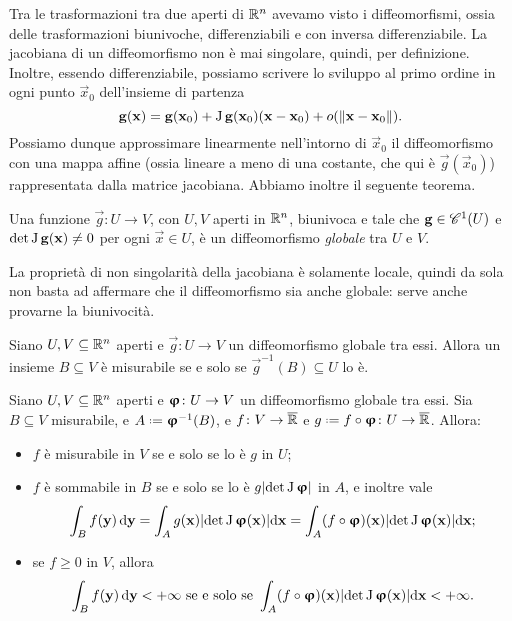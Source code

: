 Tra le trasformazioni tra due aperti di $\R^n$ avevamo visto i diffeomorfismi, ossia delle trasformazioni biunivoche, differenziabili e con inversa differenziabile. La jacobiana di un diffeomorfismo non è mai singolare, quindi, per definizione.
Inoltre, essendo differenziabile, possiamo scrivere lo sviluppo al primo ordine in ogni punto $\vec x_0$ dell'insieme di partenza
\begin{equation}
	\vec g(\vec x)=\vec g(\vec x_0)+\jac\vec g(\vec x_0)(\vec x-\vec x_0)+o(\norm{\vec x-\vec x_0}).
\end{equation}
Possiamo dunque approssimare linearmente nell'intorno di $\vec x_0$ il diffeomorfismo con una mappa affine (ossia lineare a meno di una costante, che qui è $\vec g(\vec x_0)$) rappresentata dalla matrice jacobiana.
Abbiamo inoltre il seguente teorema.
\begin{teorema} \label{t:diffeomorfismo-globale}
	Una funzione $\vec g\colon U\to V$, con $U,V$ aperti in $\R^n$, biunivoca e tale che $\vec g\in\cont[1]{U}$ e $\det\jac\vec g(\vec x)\neq 0$ per ogni $\vec x\in U$, è un diffeomorfismo \emph{globale} tra $U$ e $V$.
\end{teorema}
La proprietà di non singolarità della jacobiana è solamente locale, quindi da sola non basta ad affermare che il diffeomorfismo sia anche globale: serve anche provarne la biunivocità.
\begin{teorema} \label{t:diffeomorfismo-misurabilita-insieme}
	Siano $U,V\subseteq\R^n$ aperti e $\vec g\colon U\to V$ un diffeomorfismo globale tra essi.
	Allora un insieme $B\subseteq V$ è misurabile se e solo se $\vec g^{-1}(B)\subseteq U$ lo è.
\end{teorema}
\begin{teorema} \label{t:composizione-diffeomorfismo-misurabile}
	Siano $U,V\subseteq\R^n$ aperti e $\vphi\colon U\to V$ un diffeomorfismo globale tra essi.
	Sia $B\subseteq V$ misurabile, e $A\defeq\vphi^{-1}(B)$, e $f\colon V\to\Rex$ e $g\defeq f\circ\vphi\colon U\to\Rex$.
	Allora:
	\begin{itemize}
		\item $f$ è misurabile in $V$ se e solo se lo è $g$ in $U$;
		\item $f$ è sommabile in $B$ se e solo se lo è $g\abs{\det\jac\vphi}$ in $A$, e inoltre vale
			\begin{equation}
				\int_Bf(\vec y)\,\dd\vec y=\int_Ag(\vec x)\abs{\det\jac\vphi(\vec x)}\dd\vec x=\int_A(f\circ\vphi)(\vec x)\abs{\det\jac\vphi(\vec x)}\dd\vec x;
			\end{equation}
		\item se $f\geq 0$ in $V$, allora
			\begin{equation}
				\int_Bf(\vec y)\,\dd\vec y<+\infty\text{ se e solo se }\int_A(f\circ\vphi)(\vec x)\abs{\det\jac\vphi(\vec x)}\dd\vec x<+\infty.
			\end{equation}
	\end{itemize}
\end{teorema}
